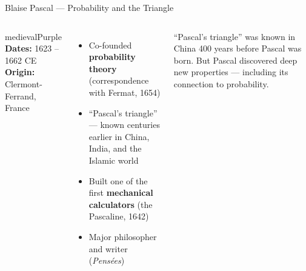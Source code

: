 \begin{frame}[shrink=25]{Blaise Pascal --- Probability and the Triangle}
  \begin{columns}[T]
    \begin{personbox}{medievalPurple}
      \textbf{Dates:} 1623 -- 1662 CE\\
      \textbf{Origin:} Clermont-Ferrand, France
    \end{personbox}
    \vspace{0.3em}
    \begin{itemize}
      \item Co-founded \textbf{probability theory} (correspondence with Fermat, 1654)
      \item ``Pascal's triangle'' --- known centuries earlier in China, India, and the Islamic world
      \item Built one of the first \textbf{mechanical calculators} (the Pascaline, 1642)
      \item Major philosopher and writer (\textit{Pens\'{e}es})
    \end{itemize}

    \vspace{0.3em}
    \begin{insightbox}
      {\footnotesize ``Pascal's triangle'' was known in China 400 years before Pascal was born. But Pascal discovered deep new properties --- including its connection to probability.}
    \end{insightbox}


    \vspace{0.3em}
  \end{columns}

\end{frame}


